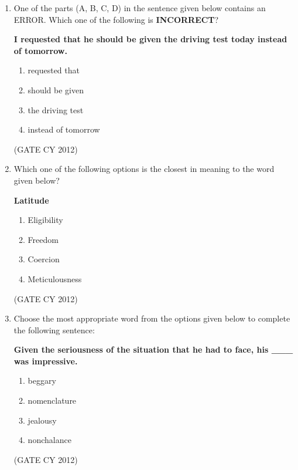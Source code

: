\documentclass[12pt]{article}
\begin{document}
\begin{enumerate}
\begin{multicols}{2}
\begin{enumerate}
    \item 2.23
    \item 4.33
    \item 11.37
    \item 27.64
\end{enumerate}
\end{multicols}
\hfill (GATE CY 2012)

\item One of the parts (A, B, C, D) in the sentence given below contains an ERROR. Which one of the following is \textbf{INCORRECT}?

\textbf{I requested that he should be given the driving test today instead of tomorrow.}

\begin{multicols}{2}
\begin{enumerate}
    \item requested that
    \item should be given
    \item the driving test
    \item instead of tomorrow
\end{enumerate}
\end{multicols}
\hfill (GATE CY 2012)

\item Which one of the following options is the closest in meaning to the word given below?

\textbf{Latitude}

\begin{multicols}{2}
\begin{enumerate}
    \item Eligibility
    \item Freedom
    \item Coercion
    \item Meticulousness
\end{enumerate}
\end{multicols}
\hfill (GATE CY 2012)

\item Choose the most appropriate word from the options given below to complete the following sentence:

\textbf{Given the seriousness of the situation that he had to face, his \_\_\_ was impressive.}

\begin{multicols}{2}
\begin{enumerate}
    \item beggary
    \item nomenclature
    \item jealousy
    \item nonchalance
\end{enumerate}
\end{multicols}
\hfill (GATE CY 2012)


\end{enumerate}
\end{document}
